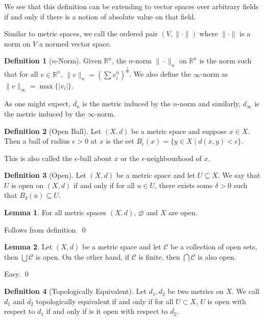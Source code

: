 \documentclass[
]{article}
\theoremstyle{definition}
\newtheorem{definition}{Definition}[section]
\newtheorem{lemma}{Lemma}[section]
\begin{document}
We see that this definition can be extending to vector spaces over
arbitrary fields if and only if there is a notion of absolute value on
that field.

Similar to metric spaces, we call the ordered pair \((V, \|\cdot\|)\)
where \(\|\cdot\|\) is a norm on \(V\) a normed vector space.

\begin{definition}[\(n\)-Norm]
  Given \(\mathbb{R}^n\), the \(n\)-norm \(\| \cdot \|_n\) on \(\mathbb{R}^n\) is 
  the norm such that for all \(v \in \mathbb{R}^n\), 
  \(\|v\|_n = \left(\sum v_i^n \right)^{\frac{1}{n}}\). We also define the 
  \(\infty\)-norm as \(\|v\|_\infty = \max\{\left|v_i\right|\}\).
\end{definition}

As one might expect, \(d_n\) is the metric induced by the \(n\)-norm and
similarly, \(d_\infty\) is the metric induced by the \(\infty\)-norm.

\begin{definition}[Open Ball]
  Let \((X, d)\) be a metric space and suppose \(x \in X\). Then a ball 
  of radius \(\epsilon > 0\) at \(x\) is the set 
  \(B_\epsilon(x) = \{y \in X \mid d(x, y) < \epsilon\}.\)
\end{definition}

This is also called the \(\epsilon\)-ball about \(x\) or the
\(\epsilon\)-neighbourhood of \(x\).

\begin{definition}[Open]
  Let \((X, d)\) be a metric space and let \(U \subseteq X\). We say that \(U\) 
  is open on \((X, d)\) if and only if for all \(u \in U\), there exists some 
  \(\delta > 0\) such that \(B_\delta(u) \subseteq U\).
\end{definition}

\begin{lemma}
  For all metric spaces \((X, d)\), \(\varnothing\) and \(X\) are open.
\end{lemma}
\proof

Follows from definition. \qed

\begin{lemma}
  Let \((X, d)\) be a metric space and let \(\mathcal{C}\) be a collection of 
  open sets, then \(\bigcup \mathcal{C}\) is open. On the other hand, if 
  \(\mathcal{C}\) is finite, then \(\bigcap\mathcal{C}\) is also open.
\end{lemma}
\proof

Easy. \qed

\begin{definition}[Topologically Equivalent]
  Let \(d_1, d_2\) be two metrics on \(X\). We call \(d_1\) and \(d_2\) 
  topologically equivalent if and only if for all \(U \subset X\), \(U\) is open
  with respect to \(d_1\) if and only if is it open with respect to \(d_2\).
\end{definition}
\end{document}
